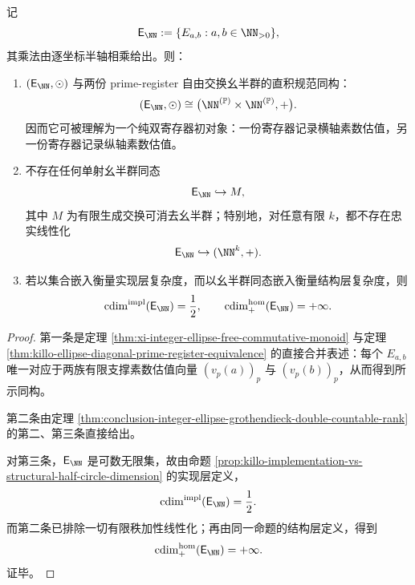 \begin{theorem}[整数轴对齐椭圆半群的双寄存器自由实现与线性化障碍]\label{thm:conclusion-integer-ellipse-double-register-free-realization}
记
\[
\mathsf E_{\NN}:=\{E_{a,b}:a,b\in\NN_{>0}\},
\]
其乘法由逐坐标半轴相乘给出。则：
\begin{enumerate}
  \item \((\mathsf E_{\NN},\odot)\) 与两份 prime-register 自由交换幺半群的直积规范同构：
  \[
  (\mathsf E_{\NN},\odot)
  \cong
  \bigl(\NN^{(\mathbb P)}\times \NN^{(\mathbb P)},+\bigr).
  \]
  因而它可被理解为一个纯双寄存器初对象：一份寄存器记录横轴素数估值，另一份寄存器记录纵轴素数估值。
  \item 不存在任何单射幺半群同态
  \[
  \mathsf E_{\NN}\hookrightarrow M,
  \]
  其中 \(M\) 为有限生成交换可消去幺半群；特别地，对任意有限 \(k\)，都不存在忠实线性化
  \[
  \mathsf E_{\NN}\hookrightarrow (\NN^k,+).
  \]
  \item 若以集合嵌入衡量实现层复杂度，而以幺半群同态嵌入衡量结构层复杂度，则
  \[
  \mathrm{cdim}^{\mathrm{impl}}(\mathsf E_{\NN})=\frac12,
  \qquad
  \mathrm{cdim}^{\mathrm{hom}}_{+}(\mathsf E_{\NN})=+\infty.
  \]
\end{enumerate}
\end{theorem}
\begin{proof}
第一条是定理 \ref{thm:xi-integer-ellipse-free-commutative-monoid} 与定理 \ref{thm:killo-ellipse-diagonal-prime-register-equivalence} 的直接合并表述：每个 \(E_{a,b}\) 唯一对应于两族有限支撑素数估值向量 \((v_p(a))_p\) 与 \((v_p(b))_p\)，从而得到所示同构。

第二条由定理 \ref{thm:conclusion-integer-ellipse-grothendieck-double-countable-rank} 的第二、第三条直接给出。

对第三条，\(\mathsf E_{\NN}\) 是可数无限集，故由命题 \ref{prop:killo-implementation-vs-structural-half-circle-dimension} 的实现层定义，
\[
\mathrm{cdim}^{\mathrm{impl}}(\mathsf E_{\NN})=\frac12.
\]
而第二条已排除一切有限秩加性线性化；再由同一命题的结构层定义，得到
\[
\mathrm{cdim}^{\mathrm{hom}}_{+}(\mathsf E_{\NN})=+\infty.
\]
证毕。
\end{proof}

